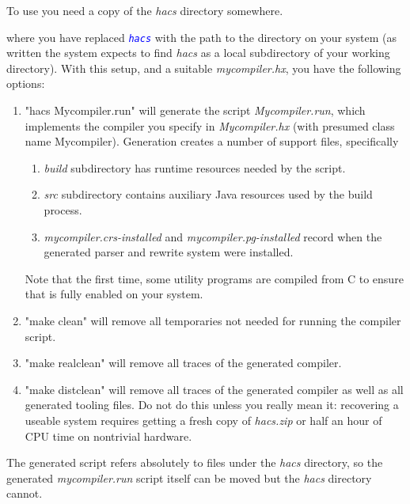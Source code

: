 \documentclass[11pt]{article} %
\begin{document}
\begin{manual}\label{man:run}\leavevmode
  To use \HAX you need a copy of the \emph{hacs} directory somewhere.

  where you have replaced \texttt{\textcolor{blue}{\emph{hacs}}} with the path to the \HAX directory
  on your system (as written the system expects to find \emph{hacs} as a local subdirectory of your
  working directory). With this setup, and a suitable \emph{mycompiler.hx}, you have the following
  options:
  \begin{enumerate}

  \item "hacs Mycompiler.run" will generate the script \emph{Mycompiler.run}, which implements the
    compiler you specify in \emph{Mycompiler.hx} (with presumed class name Mycompiler). Generation
    creates a number of support files, specifically
    \begin{enumerate}
    \item \emph{build} subdirectory has runtime resources needed by the script.
    \item \emph{src} subdirectory contains auxiliary Java resources used by the build process.
    \item \emph{mycompiler.crs-installed} and \emph{mycompiler.pg-installed} record when the
      generated parser and rewrite system were installed.
    \end{enumerate}
    Note that the first time, some utility programs are compiled from C to ensure that \HAX is fully
    enabled on your system.

  \item "make clean" will remove all temporaries not needed for running the compiler script.

  \item "make realclean" will remove all traces of the generated compiler.

  \item "make distclean" will remove all traces of the generated compiler as well as all generated
    \HAX tooling files. Do not do this unless you really mean it: recovering a useable \HAX system
    requires getting a fresh copy of \emph{hacs.zip} or half an hour of CPU time on nontrivial
    hardware.

  \end{enumerate}
  The generated script refers absolutely to files under the \emph{hacs} directory, so the generated
  \emph{mycompiler.run} script itself can be moved but the \emph{hacs} directory cannot.


\end{manual}
\end{document}
